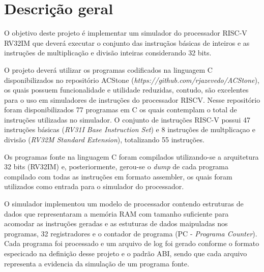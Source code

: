 
\section{Descrição geral}


O objetivo deste projeto é implementar um simulador do processador RISC-V RV32IM que deverá executar o conjunto das instruçãos básicas de inteiros e as instruções de multiplicação e divisão inteiras considerando 32 bits.

O projeto deverá utilizar os programas codificados na linguagem C disponibilizados no repositório ACStone (\textit{https://github.com/rjazevedo/ACStone}), os quais possuem funcionalidade e utilidade reduzidas, contudo, são excelentes para o uso em simuladores de instruções do processador RISCV. Nesse repositório foram disponibilizados 77 programas em C os quais contemplam o total de instruções utilizadas no simulador. O conjunto de instruções RISC-V possui 47 instruções básicas (\textit{RV31I Base Instruction Set}) e 8 instruções de multplicaçao e divisão (\textit{RV32M Standard Extension}), totalizando 55 instruções. 

Os programas fonte na linguagem C foram compilados utilizando-se a arquitetura 32 bits (RV32IM) e, posteriormente, gerou-se o \textit{dump} de cada programa compilado com todas as instruções em formato assembler, os quais foram utilizados como entrada para o simulador do processador.

O simulador implementou um modelo de processador contendo estruturas de dados que representaram a memória RAM com tamanho suficiente para acomodar as instruções geradas e as estuturas de dados maipuladas nos programas, 32 registradores e o contador de programa (PC - \textit{Programa Counter}). Cada programa foi processado e um arquivo de log foi gerado conforme o formato especicado na definição desse projeto e o padrão ABI, sendo que cada arquivo representa a evidencia da simulação de um programa fonte.